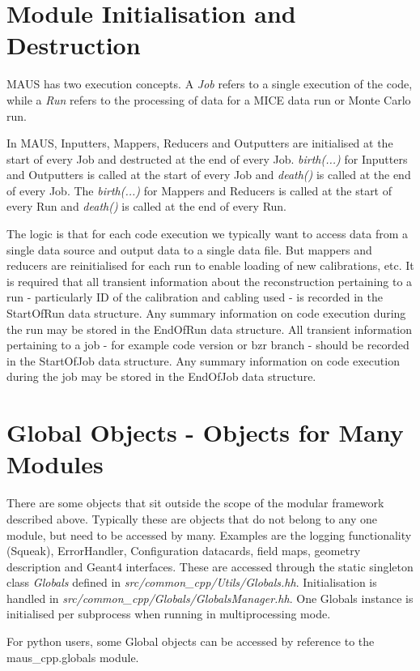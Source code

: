 \section{Module Initialisation and Destruction}
MAUS has two execution concepts. A \emph{Job} refers to a single execution of the code, while a \emph{Run} refers to the processing of data for a MICE data run or Monte Carlo run.

In MAUS, Inputters, Mappers, Reducers and Outputters are initialised at the start of every Job and destructed at the end of every Job. \emph{birth(...)} for Inputters and Outputters is called at the start of every Job and \emph{death()} is called at the end of every Job. The \emph{birth(...)} for Mappers and Reducers is called at the start of every Run and \emph{death()} is called at the end of every Run.

The logic is that for each code execution we typically want to access data from a single data source and output data to a single data file. But mappers and reducers are reinitialised for each run to enable loading of new calibrations, etc. It is required that all transient information about the reconstruction pertaining to a run - particularly ID of the calibration and cabling used - is recorded in the StartOfRun data structure. Any summary information on code execution during the run may be stored in the EndOfRun data structure. All transient information pertaining to a job - for example code version or bzr branch - should be recorded in the StartOfJob data structure. Any summary information on code execution during the job may be stored in the EndOfJob data structure.

\section{Global Objects - Objects for Many Modules}
There are some objects that sit outside the scope of the modular framework described above. Typically these are objects that do not belong to any one module, but need to be accessed by many. Examples are the logging functionality (Squeak), ErrorHandler, Configuration datacards, field maps, geometry description and Geant4 interfaces. These are accessed through the static singleton class \emph{Globals} defined in \emph{src/common_cpp/Utils/Globals.hh}. Initialisation is handled in \emph{src/common_cpp/Globals/GlobalsManager.hh}. One Globals instance is initialised per subprocess when running in multiprocessing mode.

For python users, some Global objects can be accessed by reference to the maus_cpp.globals module.

